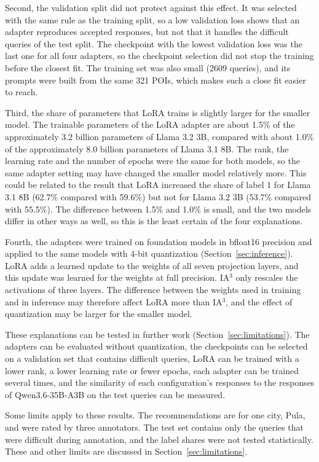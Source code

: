 \documentclass[journal,article,submit,pdftex,moreauthors]{Definitions/mdpi}
\begin{document}
Second, the validation split did not protect against this effect. It was selected with the same rule as the training split, so a low validation loss shows that an adapter reproduces accepted responses, but not that it handles the difficult queries of the test split. The checkpoint with the lowest validation loss was the last one for all four adapters, so the checkpoint selection did not stop the training before the closest fit. The training set was also small (2609 queries), and its prompts were built from the same 321 POIs, which makes such a close fit easier to reach.

Third, the share of parameters that LoRA trains is slightly larger for the smaller model. The trainable parameters of the LoRA adapter are about 1.5\% of the approximately 3.2 billion parameters of Llama 3.2 3B, compared with about 1.0\% of the approximately 8.0 billion parameters of Llama 3.1 8B. The rank, the learning rate and the number of epochs were the same for both models, so the same adapter setting may have changed the smaller model relatively more. This could be related to the result that LoRA increased the share of label 1 for Llama 3.1 8B (62.7\% compared with 59.6\%) but not for Llama 3.2 3B (53.7\% compared with 55.5\%). The difference between 1.5\% and 1.0\% is small, and the two models differ in other ways as well, so this is the least certain of the four explanations.

Fourth, the adapters were trained on foundation models in bfloat16 precision and applied to the same models with 4-bit quantization (Section~\ref{sec:inference}). LoRA adds a learned update to the weights of all seven projection layers, and this update was learned for the weights at full precision. IA$^3$ only rescales the activations of three layers. The difference between the weights used in training and in inference may therefore affect LoRA more than IA$^3$, and the effect of quantization may be larger for the smaller model.

These explanations can be tested in further work (Section~\ref{sec:limitations}). The adapters can be evaluated without quantization, the checkpoints can be selected on a validation set that contains difficult queries, LoRA can be trained with a lower rank, a lower learning rate or fewer epochs, each adapter can be trained several times, and the similarity of each configuration's responses to the responses of Qwen3.6-35B-A3B on the test queries can be measured.

Some limits apply to these results. The recommendations are for one city, Pula, and were rated by three annotators. The test set contains only the queries that were difficult during annotation, and the label shares were not tested statistically. These and other limits are discussed in Section~\ref{sec:limitations}.
\end{document}
